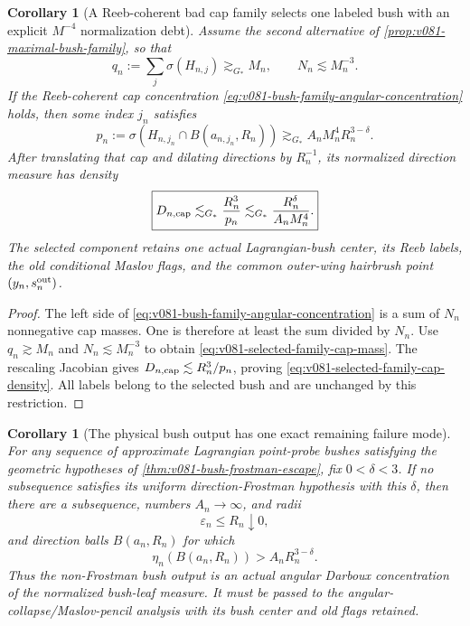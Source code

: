 \documentclass[10pt]{article}
\newtheorem{corollary}[theorem]{Corollary}
\begin{document}
\begin{corollary}[A Reeb-coherent bad cap family selects one labeled bush with an explicit \(M^{-4}\)
normalization debt]
\label{cor:v081-family-cap-single-bush-debt}
Assume the second alternative of
\cref{prop:v081-maximal-bush-family}, so that
\[
q_n:=\sum_j\sigma(H_{n,j})\gtrsim_{G_*}M_n,
\qquad
N_n\lesssim M_n^{-3}.
\]
If the Reeb-coherent cap concentration
\eqref{eq:v081-bush-family-angular-concentration} holds, then some index \(j_n\) satisfies
\begin{equation}
\label{eq:v081-selected-family-cap-mass}
\boxed{
p_n
:=
\sigma\!\left(H_{n,j_n}\cap B(a_{n,j_n},R_n)\right)
\gtrsim_{G_*}
A_nM_n^4R_n^{3-\delta}.
}
\end{equation}
After translating that cap and dilating directions by \(R_n^{-1}\), its normalized direction
measure has density
\begin{equation}
\label{eq:v081-selected-family-cap-density}
\boxed{
D_{n,\rm cap}
\lesssim_{G_*}
\frac{R_n^3}{p_n}
\lesssim_{G_*}
\frac{R_n^\delta}{A_nM_n^4}.
}
\end{equation}
The selected component retains one actual Lagrangian-bush center, its Reeb labels, the old
conditional Maslov flags, and the common outer-wing hairbrush point
\((y_n,s_n^{\rm out})\).
\end{corollary}

\begin{proof}
The left side of
\eqref{eq:v081-bush-family-angular-concentration} is a sum of \(N_n\) nonnegative cap masses.
One is therefore at least the sum divided by \(N_n\).  Use
\(q_n\gtrsim M_n\) and \(N_n\lesssim M_n^{-3}\) to obtain
\eqref{eq:v081-selected-family-cap-mass}.  The rescaling Jacobian gives
\(D_{n,\rm cap}\lesssim R_n^3/p_n\), proving
\eqref{eq:v081-selected-family-cap-density}.  All labels belong to the selected bush and are
unchanged by this restriction.
\end{proof}

\begin{corollary}[The physical bush output has one exact remaining failure mode]
\label{cor:v081-bush-frostman-or-angular-concentration}
For any sequence of approximate Lagrangian point-probe bushes satisfying the geometric hypotheses
of \cref{thm:v081-bush-frostman-escape}, fix \(0<\delta<3\).  If no subsequence satisfies its
uniform direction-Frostman hypothesis with this \(\delta\), then there are a subsequence, numbers
\(A_n\to\infty\), and radii
\[
\varepsilon_n\le R_n\downarrow0,
\]
and direction balls \(B(a_n,R_n)\) for which
\begin{equation}
\label{eq:v081-bush-angular-concentration}
\boxed{
\eta_n(B(a_n,R_n))
>
A_n
R_n^{3-\delta}.
}
\end{equation}
Thus the non-Frostman bush output is an actual angular Darboux concentration of the normalized
bush-leaf measure.  It must be passed to the angular-collapse/Maslov-pencil analysis with its bush
center and old flags retained.
\end{corollary}
\end{document}
